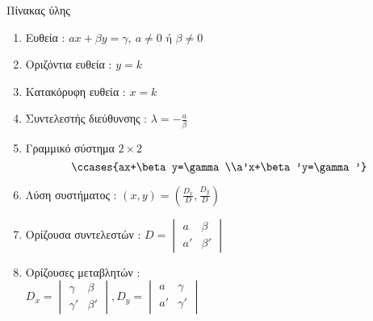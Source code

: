 \documentclass[twoside,nofonts,internet,math,spyros]{frontisthrio}
\begin{document}
\begin{mybox}[mysubtitle]{Πίνακας ύλης}
\begin{multicols}{2}
\begin{enumerate}[itemsep=0mm]
\item Ευθεία : $ ax+\beta y=\gamma,\ a\neq0\textrm{ ή }\beta\neq0 $
\item Οριζόντια ευθεία : $ y=k $
\item Κατακόρυφη ευθεία : $ x=k $
\item Συντελεστής διεύθυνσης : $ \lambda=-\frac{a}{\beta} $
\item Γραμμικό σύστημα $ 2\times 2 $
\[ \ccases{ax+\beta y=\gamma\\a'x+\beta'y=\gamma'} \]
\item Λύση συστήματος : $ (x,y)=\left(\frac{D_x}{D},\frac{D_y}{D}\right) $
\item Ορίζουσα συντελεστών : $ D=\begin{vmatrix}
a & \beta\\a' & \beta'
\end{vmatrix}$
\item Ορίζουσες μεταβλητών :\\$ D_x=\begin{vmatrix}
\gamma & \beta\\\gamma' & \beta'
\end{vmatrix},D_y=\begin{vmatrix}
a & \gamma\\a' & \gamma'
\end{vmatrix} $
\end{enumerate}
\end{multicols}
\end{mybox}
\newpage
\end{document}
